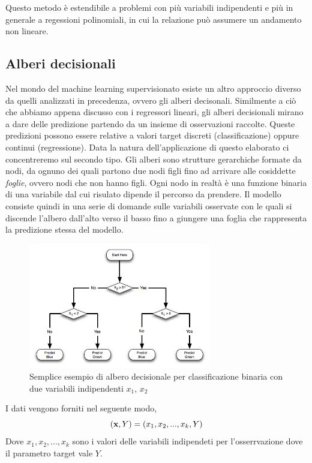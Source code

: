 \documentclass[12pt,a4paper,openright,twoside]{report}
\begin{document}
Questo metodo è estendibile a problemi con più variabili indipendenti e più in generale a regessioni polinomiali, in cui la relazione può assumere un andamento non lineare.

\subsection{Alberi decisionali}
Nel mondo del machine learning supervisionato esiste un altro approccio diverso da quelli analizzati in precedenza, ovvero gli alberi decisonali. 
Similmente a ciò che abbiamo appena discusso con i regressori lineari, gli alberi decisionali mirano a dare delle predizione partendo da un insieme di osservazioni raccolte. Queste predizioni possono essere relative a valori target discreti (classificazione) oppure continui (regressione). Data la natura dell'applicazione di questo elaborato ci concentreremo sul secondo tipo. 
Gli alberi sono strutture gerarchiche formate da nodi, da ognuno dei quali partono due nodi figli fino ad arrivare alle cosiddette \emph{foglie}, ovvero nodi che non hanno figli. Ogni nodo in realtà è una funzione binaria di una variabile dal cui risulato dipende il percorso da prendere. 
Il modello consiste quindi in una serie di domande sulle variabili osservate con le quali si discende l'albero dall'alto verso il basso fino a giungere una foglia che rappresenta la predizione stessa del modello. 
\begin{center}
\begin{figure}[h]
\centering
\includegraphics[width=300px,keepaspectratio]{DecisionTree_Classification_Graphic.png}
\caption{Semplice esempio di albero decisionale per classificazione binaria con due variabili indipendenti $x_{1}$, $x_{2}$  }
\end{figure}    
\end{center}
I dati vengono forniti nel seguente modo, 
\begin{equation}
    (\bold{x}, Y) = (x_{1}, x_{2}, ... , x_{k}, Y) 
\end{equation}
Dove $x_{1}, x_{2}, ... , x_{k}$ sono i valori delle variabili indipendeti per l'osserrvazione dove il parametro target vale $Y$.
\end{document}
